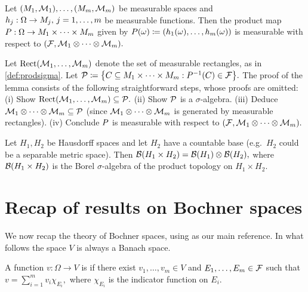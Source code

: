 \label{lem:measprod}

Let $\mleft(\M_1,\FM_1\mright),\ldots,\mleft(\M_m,\FM_m\mright)$ be measurable spaces and $h_j:\Omega \rightarrow M_j,\, j = 1,\ldots,m$ be measurable functions. Then the product map $P:\Omega \rightarrow M_1 \times \cdots \times M_m$ given by
$\Prodf(\omega) \de \mleft(h_1(\omega),\ldots,h_m(\omega)\mright)$
is measurable with respect to $\mleft(\cF,\FM_1 \otimes \cdots\otimes\FM_m\mright).$
\ele


Let $\measrectmany{\FM_1,\ldots,\FM_m}$ denote the set of measurable rectangles, as in \cref{def:prodsigma}. Let %
$\cP \de \set{C \subseteq \M_1 \times \cdots \times \M_m \st \Prodf^{-1}\mleft(C\mright) \in \cF}.$
The proof of the lemma consists of the following straightforward steps, whose proofs are omitted:
(i) Show $\measrectmany{\FM_1,\ldots,\FM_m} \subseteq \cP.$
(ii) Show $\mathcal P$ is a $\sigma$-algebra.
(iii) Deduce $\mathcal M_1 \otimes \cdots \otimes \mathcal M_m \subseteq \mathcal P$ (since $\mathcal M_1 \otimes \cdots \otimes \mathcal M_m$ is generated by measurable rectangles).
(iv) Conclude $P$ is measurable with respect to $\mleft(\cF,\FM_1\otimes\cdots\otimes\FM_m\mright).$
\epf

\label{lem:bogachev}
Let $H_1,H_2$ be Hausdorff spaces and let $H_2$ have a countable base (e.g.~$H_2$ could be a separable metric space). Then $\Borel{H_1\times H_2} = \Borel{H_1} \otimes \Borel{H_2},$ where $\Borel{H_1\times H_2}$ is the Borel $\sigma$-algebra of the product topology on $H_1\times H_2.$
\ele

\section{Recap of results on Bochner spaces}

We now recap the theory of Bochner spaces, using \cite{DiUh:77} as our main reference. In what follows the space $V$ is always a Banach space.

A function $v:\Omega \rightarrow V$ is  if there exist $v_1,\ldots,v_m \in V$ and $E_1,\ldots,E_m \in \mathcal F$ such that
$v = \sum_{i=1}^m v_i \chi_{E_{i}},$
where $\chi_{E_{i}}$ is the indicator function on $E_{i}.$
\ede

